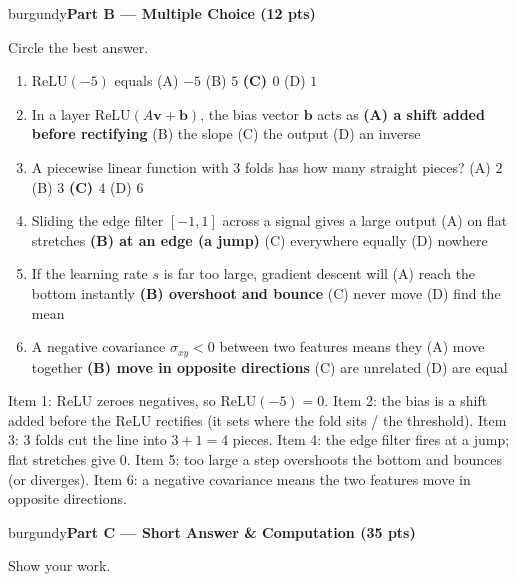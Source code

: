 \documentclass[10pt]{article}
\newcommand{\vv}{\mathbf{v}}
\newcommand{\bb}{\mathbf{b}}
\newcommand{\relu}{\mathrm{ReLU}}
\newcommand{\parthead}[1]{%
  \vspace{6pt}\noindent
  \begin{headlinebox}{burgundy}{\color{white}\bfseries #1}\end{headlinebox}%
  \vspace{4pt}}
\begin{document}
\parthead{Part B --- Multiple Choice (12 pts)}
Circle the best answer.

\begin{enumerate}[leftmargin=1.9em, itemsep=9pt]
  \item $\relu(-5)$ equals
    \hfill (A) $-5$ \quad (B) $5$ \quad \textbf{(C) $0$} \ans{$\leftarrow$} \quad (D) $1$
  \item In a layer $\relu(A\vv+\bb)$, the bias vector $\bb$ acts as
    \hfill \textbf{(A) a shift added before rectifying} \ans{$\leftarrow$} \quad (B) the slope \quad (C) the output \quad (D) an inverse
  \item A piecewise linear function with $3$ folds has how many straight pieces?
    \hfill (A) $2$ \quad (B) $3$ \quad \textbf{(C) $4$} \ans{$\leftarrow$} \quad (D) $6$
  \item Sliding the edge filter $[-1,1]$ across a signal gives a large output
    \hfill (A) on flat stretches \quad \textbf{(B) at an edge (a jump)} \ans{$\leftarrow$} \quad (C) everywhere equally \quad (D) nowhere
  \item If the learning rate $s$ is far too large, gradient descent will
    \hfill (A) reach the bottom instantly \quad \textbf{(B) overshoot and bounce} \ans{$\leftarrow$} \quad (C) never move \quad (D) find the mean
  \item A negative covariance $\sigma_{xy}<0$ between two features means they
    \hfill (A) move together \quad \textbf{(B) move in opposite directions} \ans{$\leftarrow$} \quad (C) are unrelated \quad (D) are equal
\end{enumerate}

\begin{teachernote}
Item 1: ReLU zeroes negatives, so $\relu(-5)=0$. Item 2: the bias is a shift added before the ReLU rectifies (it sets
where the fold sits / the threshold). Item 3: $3$ folds cut the line into $3+1=4$ pieces. Item 4: the edge filter fires
at a jump; flat stretches give $0$. Item 5: too large a step overshoots the bottom and bounces (or diverges). Item 6:
a negative covariance means the two features move in opposite directions.
\end{teachernote}

\parthead{Part C --- Short Answer \& Computation (35 pts)}
Show your work.
\end{document}
